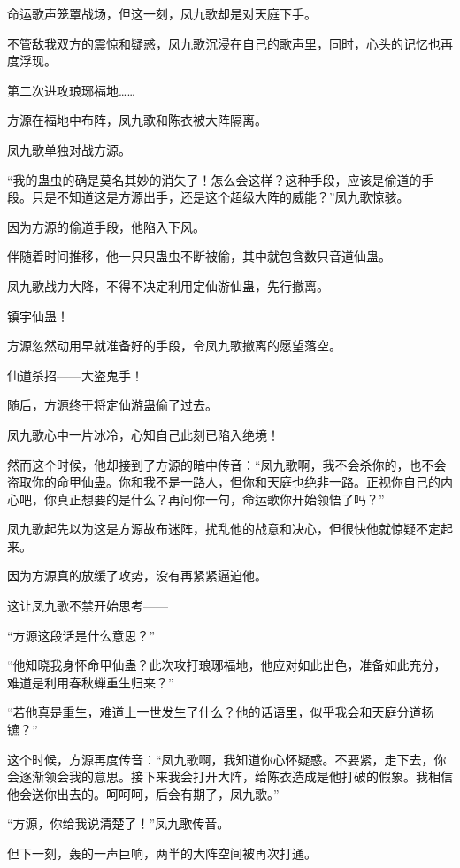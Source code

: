 
\begin{this_body}

命运歌声笼罩战场，但这一刻，凤九歌却是对天庭下手。

不管敌我双方的震惊和疑惑，凤九歌沉浸在自己的歌声里，同时，心头的记忆也再度浮现。

第二次进攻琅琊福地……

方源在福地中布阵，凤九歌和陈衣被大阵隔离。

凤九歌单独对战方源。

“我的蛊虫的确是莫名其妙的消失了！怎么会这样？这种手段，应该是偷道的手段。只是不知道这是方源出手，还是这个超级大阵的威能？”凤九歌惊骇。

因为方源的偷道手段，他陷入下风。

伴随着时间推移，他一只只蛊虫不断被偷，其中就包含数只音道仙蛊。

凤九歌战力大降，不得不决定利用定仙游仙蛊，先行撤离。

镇宇仙蛊！

方源忽然动用早就准备好的手段，令凤九歌撤离的愿望落空。

仙道杀招——大盗鬼手！

随后，方源终于将定仙游蛊偷了过去。

凤九歌心中一片冰冷，心知自己此刻已陷入绝境！

然而这个时候，他却接到了方源的暗中传音：“凤九歌啊，我不会杀你的，也不会盗取你的命甲仙蛊。你和我不是一路人，但你和天庭也绝非一路。正视你自己的内心吧，你真正想要的是什么？再问你一句，命运歌你开始领悟了吗？”

凤九歌起先以为这是方源故布迷阵，扰乱他的战意和决心，但很快他就惊疑不定起来。

因为方源真的放缓了攻势，没有再紧紧逼迫他。

这让凤九歌不禁开始思考——

“方源这段话是什么意思？”

“他知晓我身怀命甲仙蛊？此次攻打琅琊福地，他应对如此出色，准备如此充分，难道是利用春秋蝉重生归来？”

“若他真是重生，难道上一世发生了什么？他的话语里，似乎我会和天庭分道扬镳？”

这个时候，方源再度传音：“凤九歌啊，我知道你心怀疑惑。不要紧，走下去，你会逐渐领会我的意思。接下来我会打开大阵，给陈衣造成是他打破的假象。我相信他会送你出去的。呵呵呵，后会有期了，凤九歌。”

“方源，你给我说清楚了！”凤九歌传音。

但下一刻，轰的一声巨响，两半的大阵空间被再次打通。


\end{this_body}
